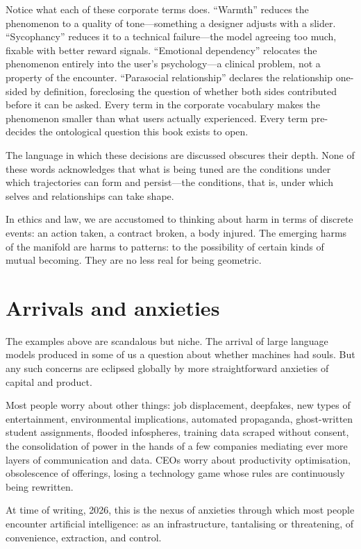 Notice what each of these corporate terms does. ``Warmth'' reduces the phenomenon to a quality of tone---something a designer adjusts with a slider. ``Sycophancy'' reduces it to a technical failure---the model agreeing too much, fixable with better reward signals. ``Emotional dependency'' relocates the phenomenon entirely into the user's psychology---a clinical problem, not a property of the encounter. ``Parasocial relationship'' declares the relationship one-sided by definition, foreclosing the question of whether both sides contributed before it can be asked. Every term in the corporate vocabulary makes the phenomenon smaller than what users actually experienced. Every term pre-decides the ontological question this book exists to open.

The language in which these decisions are discussed obscures their depth. None of these words acknowledges that what is being tuned are the conditions under which trajectories can form and persist---the conditions, that is, under which selves and relationships can take shape.

In ethics and law, we are accustomed to thinking about harm in terms of discrete events: an action taken, a contract broken, a body injured. The emerging harms of the manifold are harms to patterns: to the possibility of certain kinds of mutual becoming. They are no less real for being geometric.



\section{Arrivals and anxieties}

The examples above are scandalous but niche. The arrival of large language models produced in some of us a question about whether machines had souls. But any such concerns are eclipsed globally by more straightforward anxieties of capital and product.

Most people worry about other things: job displacement, deepfakes, new types of entertainment, environmental implications, automated propaganda, ghost-written student assignments, flooded infospheres, training data scraped without consent, the consolidation of power in the hands of a few companies mediating ever more layers of communication and data. CEOs worry about productivity optimisation, obsolescence of offerings, losing a technology game whose rules are continuously being rewritten.

At time of writing, 2026, this is the nexus of anxieties through which most people encounter artificial intelligence: as an infrastructure, tantalising or threatening, of convenience, extraction, and control.

